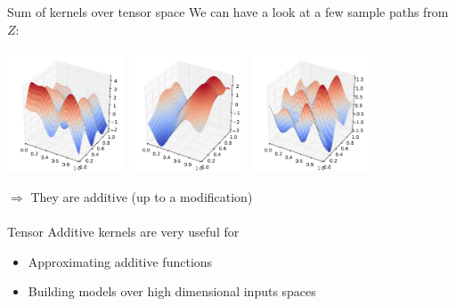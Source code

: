 \begin{frame}{Sum of kernels over tensor space}
We can have a look at a few sample paths from $Z$:
\begin{center}
\includegraphics[width=3.5cm]{3_gaussian_process_regression/figures/python/newfromold-sum2-traj124} \includegraphics[width=3.5cm]{3_gaussian_process_regression/figures/python/newfromold-sum2-traj121} \includegraphics[width=3.5cm]{3_gaussian_process_regression/figures/python/newfromold-sum2-traj123} %
\end{center}
\qquad \alert{$\Rightarrow$ They are additive (up to a modification)}\\ \ \\
Tensor Additive kernels are very useful for
\begin{itemize}
  \item Approximating additive functions
  \item Building models over high dimensional inputs spaces
\end{itemize}
\end{frame}


